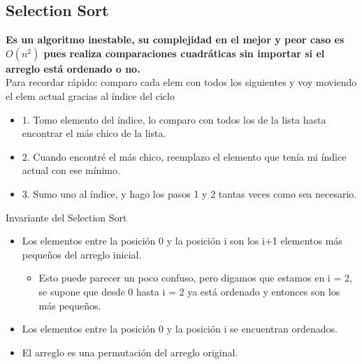 \documentclass[10pt,a4paper]{article}
\begin{document}
\subsection*{Selection Sort}
\textbf{Es un algoritmo inestable, su complejidad en el mejor y peor caso es $O(n^{2})$ pues realiza comparaciones cuadráticas sin importar si el arreglo está ordenado o no.} \\
Para recordar rápido: comparo cada elem con todos los siguientes y voy moviendo el elem actual gracias al índice del ciclo
\begin{itemize}
    \item 1. Tomo elemento del índice, lo comparo con todos los de la lista hasta encontrar el más chico de la lista. 
    \item 2. Cuando encontré el más chico, reemplazo el elemento que tenía mi índice actual con ese mínimo.
    \item 3. Sumo uno al índice, y hago los pasos 1 y 2 tantas veces como sea necesario.
\end{itemize}
Invariante del Selection Sort
\begin{itemize}
    \item Los elementos entre la posición 0 y la posición i son los i+1 elementos más pequeños del arreglo inicial. 
    \begin{itemize}
        \item Esto puede parecer un poco confuso, pero digamos que estamos en i = 2, se supone que desde 0 hasta i = 2 ya está ordenado y entonces son los más pequeños. 
    \end{itemize}
    \item Los elementos entre la posición 0 y la posición i se encuentran ordenados.
    \item El arreglo es una permutación del arreglo original.
\end{itemize}
\end{document}
